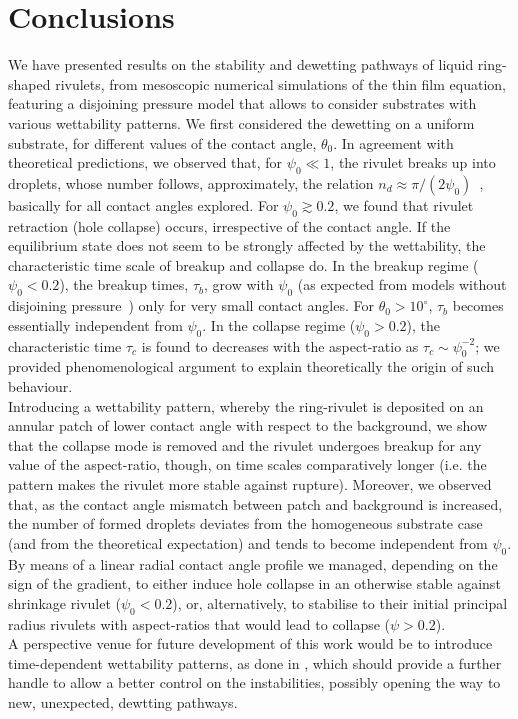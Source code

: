 \documentclass[twoside,twocolumn,9pt]{article}
\begin{document}
\section{Conclusions}\label{sec:conclu}
We have presented results on the stability and dewetting pathways of liquid ring-shaped rivulets, from mesoscopic numerical simulations of the thin film equation, featuring a disjoining pressure model that allows to consider substrates with various wettability patterns. 
We first considered the dewetting on a uniform substrate, for different values of the contact angle, $\theta_0$. 
In agreement with theoretical predictions, we observed that, for $\psi_0 \ll 1$, the rivulet breaks up into droplets, whose number follows, approximately, the relation $n_d \approx \pi/(2\psi_0)$~\cite{gonzalezStabilityLiquidRing2013}, basically for all contact angles explored.
For $\psi_0 \gtrsim 0.2$, we found that rivulet retraction (hole collapse) occurs, irrespective of the contact angle. 
If the equilibrium state does not seem to be strongly affected by the wettability, the characteristic time scale of breakup and collapse do. 
In the breakup regime ($\psi_0 < 0.2$), the breakup times, $\tau_b$, grow with $\psi_0$ (as expected from models without disjoining pressure~\cite{gonzalezStabilityLiquidRing2013}) only for very small contact angles. 
For $\theta_0 > 10^{\circ}$, $\tau_b$ becomes essentially independent from $\psi_0$. 
In the collapse regime ($\psi_0 > 0.2$), the characteristic time $\tau_c$ is found to decreases with the aspect-ratio as $\tau_c  \sim \psi_0^{-2}$; we provided phenomenological argument to explain theoretically the origin of such behaviour.\\
Introducing a wettability pattern, whereby the ring-rivulet is deposited on an annular patch of lower contact angle with respect to the background, we show that the collapse mode is removed and the rivulet undergoes breakup for any value of the aspect-ratio, though, on time scales comparatively longer (i.e. the pattern makes the rivulet more stable against rupture). 
Moreover, we observed that, as the contact angle mismatch between patch and background is increased, the number of formed droplets deviates from the homogeneous substrate case (and from the theoretical expectation) and tends to become independent from $\psi_0$.\\
By means of a linear radial contact angle profile we managed, depending on the sign of the gradient, to either induce hole collapse in an otherwise stable against shrinkage rivulet ($\psi_0<0.2$), or, alternatively, to stabilise to their initial principal radius rivulets with aspect-ratios that would lead to collapse ($\psi>0.2$). \\
A perspective venue for future development of this work would be to introduce time-dependent wettability patterns, as done in \cite{zitzControllingDewettingMorphologies2023}, which should provide a further handle to allow a better control on the instabilities, possibly opening the way to new, unexpected, dewtting pathways.
\end{document}
